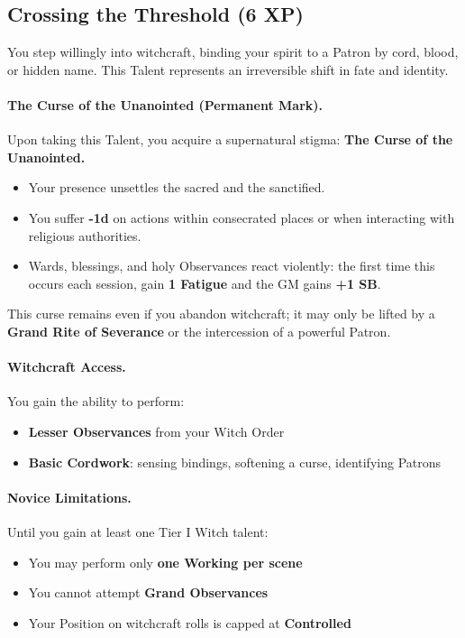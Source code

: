 \documentclass[11pt]{book}
\begin{document}
\subsection*{Crossing the Threshold (6 XP)}

\begin{tcolorbox}[colback=mistgray!10,colframe=shadowpurple,
title={\textbf{Crossing the Threshold} --- Witch Initiation Talent (6 XP)}]

You step willingly into witchcraft, binding your spirit to a Patron by cord, blood, or hidden name.
This Talent represents an irreversible shift in fate and identity.

\paragraph{The Curse of the Unanointed (Permanent Mark).}
Upon taking this Talent, you acquire a supernatural stigma:  
\textbf{The Curse of the Unanointed.}

\begin{itemize}[leftmargin=1.5em]
    \item Your presence unsettles the sacred and the sanctified.
    \item You suffer \textbf{-1d} on actions within consecrated places
    or when interacting with religious authorities.
    \item Wards, blessings, and holy Observances react violently:
    the first time this occurs each session, gain \textbf{1 Fatigue} and the GM gains \textbf{+1 SB}.
\end{itemize}

This curse remains even if you abandon witchcraft; it may only be lifted by a
\textbf{Grand Rite of Severance} or the intercession of a powerful Patron.

\paragraph{Witchcraft Access.}
You gain the ability to perform:
\begin{itemize}[leftmargin=1.5em]
    \item \textbf{Lesser Observances} from your Witch Order
    \item \textbf{Basic Cordwork}: sensing bindings, softening a curse, identifying Patrons
\end{itemize}

\paragraph{Novice Limitations.}
Until you gain at least one Tier I Witch talent:
\begin{itemize}[leftmargin=1.5em]
    \item You may perform only \textbf{one Working per scene}
    \item You cannot attempt \textbf{Grand Observances}
    \item Your Position on witchcraft rolls is capped at \textbf{Controlled}
\end{itemize}


\end{tcolorbox}
\end{document}
